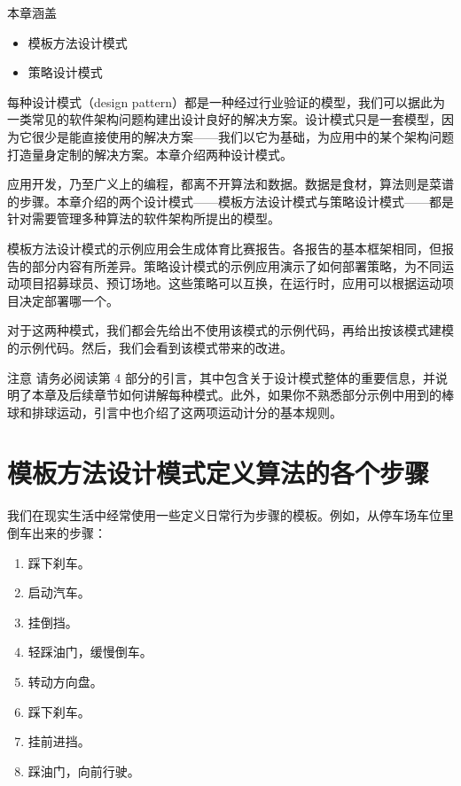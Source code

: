 \begin{myChapterIntro}{本章涵盖}
\begin{itemize}
\item 模板方法设计模式
\item 策略设计模式
\end{itemize}
\end{myChapterIntro}

每种设计模式（design pattern）都是一种经过行业验证的模型，我们可以据此为一类常见的软件架构问题构建出设计良好的解决方案。设计模式只是一套模型，因为它很少是能直接使用的解决方案——我们以它为基础，为应用中的某个架构问题打造量身定制的解决方案。本章介绍两种设计模式。


应用开发，乃至广义上的编程，都离不开算法和数据。数据是食材，算法则是菜谱的步骤。本章介绍的两个设计模式——模板方法设计模式与策略设计模式——都是针对需要管理多种算法的软件架构所提出的模型。

模板方法设计模式的示例应用会生成体育比赛报告。各报告的基本框架相同，但报告的部分内容有所差异。策略设计模式的示例应用演示了如何部署策略，为不同运动项目招募球员、预订场地。这些策略可以互换，在运行时，应用可以根据运动项目决定部署哪一个。

对于这两种模式，我们都会先给出不使用该模式的示例代码，再给出按该模式建模的示例代码。然后，我们会看到该模式带来的改进。

\begin{myWarning}{注意}
请务必阅读第 4 部分的引言，其中包含关于设计模式整体的重要信息，并说明了本章及后续章节如何讲解每种模式。此外，如果你不熟悉部分示例中用到的棒球和排球运动，引言中也介绍了这两项运动计分的基本规则。
\end{myWarning}

\section{模板方法设计模式定义算法的各个步骤}

我们在现实生活中经常使用一些定义日常行为步骤的模板。例如，从停车场车位里倒车出来的步骤：

\begin{enumerate}
\item 踩下刹车。
\item 启动汽车。
\item 挂倒挡。
\item 轻踩油门，缓慢倒车。
\item 转动方向盘。
\item 踩下刹车。
\item 挂前进挡。
\item 踩油门，向前行驶。
\end{enumerate}

